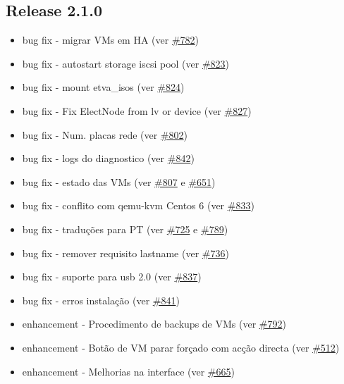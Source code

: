 \subsection{Release 2.1.0}
\begin{itemize}
	\item bug fix - migrar VMs em HA (ver \href{https://srcmaster.eurotux.com/pm/p/etva/ticket/782}{\#782})
	\item bug fix - autostart storage iscsi pool (ver \href{https://srcmaster.eurotux.com/pm/p/etva/ticket/823}{\#823})
	\item bug fix - mount etva\_isos (ver \href{https://srcmaster.eurotux.com/pm/p/etva/ticket/824}{\#824})
	\item bug fix - Fix ElectNode from lv or device (ver \href{https://srcmaster.eurotux.com/pm/p/etva/ticket/827}{\#827})
	\item bug fix - Num. placas rede (ver \href{https://srcmaster.eurotux.com/pm/p/etva/ticket/802}{\#802})
	\item bug fix - logs do diagnostico (ver \href{https://srcmaster.eurotux.com/pm/p/etva/ticket/842}{\#842})
	\item bug fix - estado das VMs (ver \href{https://srcmaster.eurotux.com/pm/p/etva/ticket/807}{\#807} e \href{https://srcmaster.eurotux.com/pm/p/etva/ticket/651}{\#651})
	\item bug fix - conflito com qemu-kvm Centos 6 (ver \href{https://srcmaster.eurotux.com/pm/p/etva/ticket/833}{\#833})
	\item bug fix - traduções para PT (ver \href{https://srcmaster.eurotux.com/pm/p/etva/ticket/725}{\#725} e \href{https://srcmaster.eurotux.com/pm/p/etva/ticket/789}{\#789})
	\item bug fix - remover requisito lastname (ver \href{https://srcmaster.eurotux.com/pm/p/etva/ticket/736}{\#736})
	\item bug fix - suporte para usb 2.0 (ver \href{https://srcmaster.eurotux.com/pm/p/etva/ticket/837}{\#837})
	\item bug fix - erros instalação (ver \href{https://srcmaster.eurotux.com/pm/p/etva/ticket/841}{\#841})
	\item enhancement - Procedimento de backups de VMs (ver \href{https://srcmaster.eurotux.com/pm/p/etva/ticket/792}{\#792})
	\item enhancement - Botão de VM parar forçado com acção directa (ver \href{https://srcmaster.eurotux.com/pm/p/etva/ticket/512}{\#512})
	\item enhancement - Melhorias na interface (ver \href{https://srcmaster.eurotux.com/pm/p/etva/ticket/665}{\#665})

\end{itemize}

